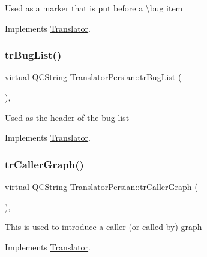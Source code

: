 Used as a marker that is put before a \textbackslash{}bug item 

Implements \mbox{\hyperlink{class_translator}{Translator}}.

\mbox{\label{class_translator_persian_aa14e866e1bf12f10fe27e2a9037810d0}} 
\subsubsection{\texorpdfstring{trBugList()}{trBugList()}}
{\footnotesize\ttfamily virtual \mbox{\hyperlink{class_q_c_string}{Q\+C\+String}} Translator\+Persian\+::tr\+Bug\+List (\begin{DoxyParamCaption}{ }\end{DoxyParamCaption})\hspace{0.3cm}{\ttfamily [inline]}, {\ttfamily [virtual]}}

Used as the header of the bug list 

Implements \mbox{\hyperlink{class_translator}{Translator}}.

\mbox{\label{class_translator_persian_a598d36e9b6fe91aec00a1336a644f7dd}} 
\subsubsection{\texorpdfstring{trCallerGraph()}{trCallerGraph()}}
{\footnotesize\ttfamily virtual \mbox{\hyperlink{class_q_c_string}{Q\+C\+String}} Translator\+Persian\+::tr\+Caller\+Graph (\begin{DoxyParamCaption}{ }\end{DoxyParamCaption})\hspace{0.3cm}{\ttfamily [inline]}, {\ttfamily [virtual]}}

This is used to introduce a caller (or called-\/by) graph 

Implements \mbox{\hyperlink{class_translator}{Translator}}.

\mbox{\label{class_translator_persian_aa526db6e935668d1daa7c0a9c4ceb8b8}} 
